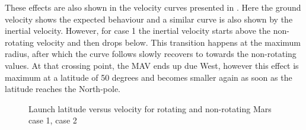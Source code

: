 \noindent
These effects are also shown in the velocity curves presented in . Here the ground velocity shows the expected behaviour and a similar curve is also shown by the inertial velocity. However, for case 1 the inertial velocity starts above the non-rotating velocity and then drops below. This transition happens at the maximum radius, after which the curve follows slowly recovers to towards the non-rotating values. At that crossing point, the \ac{MAV} ends up due West, however this effect is maximum at a latitude of 50 degrees and becomes smaller again as soon as the latitude reaches the North-pole.

\begin{figure}[H]
\centering
{} 
\caption{Launch latitude versus velocity for rotating and non-rotating Mars \protect{} case 1,  \protect{} case 2 } 
\label{fig:launchLatitudeVsVelocityCase1combined} 
\end{figure}



